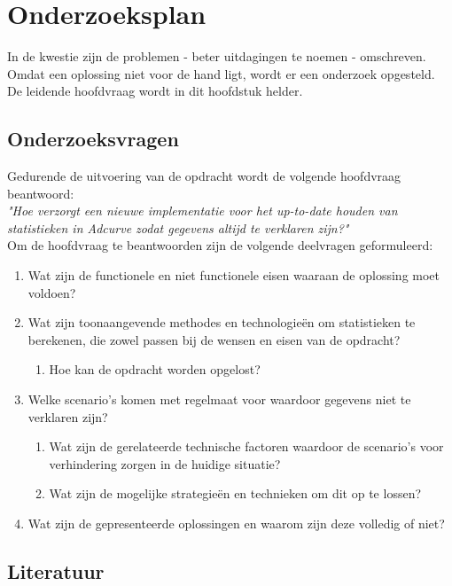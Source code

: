 \chapter{Onderzoeksplan}

In de kwestie zijn de problemen - beter uitdagingen te noemen - omschreven. Omdat een oplossing niet voor de hand ligt, wordt er een onderzoek opgesteld. De leidende hoofdvraag wordt in dit hoofdstuk helder.

\section{Onderzoeksvragen}
Gedurende de uitvoering van de opdracht wordt de volgende hoofdvraag beantwoord: \\
{\large \textit{"Hoe verzorgt een nieuwe implementatie voor het up-to-date houden van statistieken in Adcurve zodat gegevens altijd te verklaren zijn?"}} \\

Om de hoofdvraag te beantwoorden zijn de volgende deelvragen geformuleerd:
\begin{enumerate}
\item Wat zijn de functionele en niet functionele eisen waaraan de oplossing moet voldoen?
\item Wat zijn toonaangevende methodes en technologieën om statistieken te berekenen, die zowel passen bij de wensen en eisen van de opdracht?
\begin{enumerate}
    \item Hoe kan de opdracht worden opgelost?
\end{enumerate}
\item Welke scenario's komen met regelmaat voor waardoor gegevens niet te verklaren zijn?
\begin{enumerate}
    \item Wat zijn de gerelateerde technische factoren waardoor de scenario's voor verhindering zorgen in de huidige situatie?
    \item Wat zijn de mogelijke strategieën en technieken om dit op te lossen?
\end{enumerate}

\item Wat zijn de gepresenteerde oplossingen en waarom zijn deze volledig of niet?
\end{enumerate}

\section{Literatuur} %

